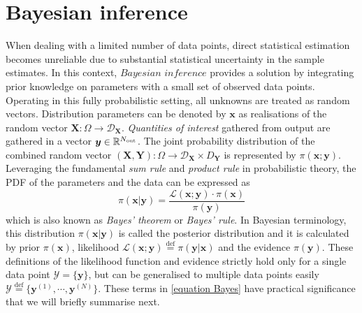 \label{ch:Bayesian}


\section{Bayesian inference}

When dealing with a limited number of data points, direct statistical estimation becomes unreliable due to substantial statistical uncertainty in the sample estimates. In this context, $\textit{Bayesian inference}$ provides a solution by integrating prior knowledge on parameters with a small set of observed data points. Operating in this fully probabilistic setting, all unknowns are treated as random vectors. Distribution parameters can be denoted by $\boldsymbol{x}$ as realisations of the random vector $\boldsymbol{X}:\Omega \rightarrow \mathcal{D}_{\boldsymbol{X}}$. \textit{Quantities of interest} gathered from output are gathered in a vector $\boldsymbol{y} \in \mathbb{R}^{N_{\rm{out}}}$. The joint probability distribution of the combined random vector $(\boldsymbol{X},\boldsymbol{Y}):\Omega \rightarrow \mathcal{D}_{\boldsymbol{X}} \times {D}_{\boldsymbol{Y}}$ is represented by $\pi(\boldsymbol{x};\boldsymbol{y})$. Leveraging the fundamental \textit{sum rule} and \textit{product rule} in probabilistic theory, the \acrfull{PDF} of the parameters and the data can be expressed as
\begin{equation}
\pi(\boldsymbol{x}|\boldsymbol{y}) = \frac{{\mathcal{L}(\boldsymbol{x};\boldsymbol{y}) \cdot \pi(\boldsymbol{x})}}{{\pi(\boldsymbol{y})}} \label{equation Bayes}
\end{equation}
which is also known as \textit{Bayes' theorem} or \textit{Bayes' rule}. In Bayesian terminology, this distribution $\pi(\boldsymbol{x}|\boldsymbol{y})$ is called the posterior distribution and it is calculated by prior $\pi(\boldsymbol{x})$, likelihood $\mathcal{L}(\boldsymbol{x};\boldsymbol{y})\stackrel{\mathrm{def}}{=}\pi(\boldsymbol{y}|\boldsymbol{x})$
and the evidence $\pi(\boldsymbol{y})$. These definitions of the likelihood function and evidence strictly hold only for a single data point $\mathcal{Y}=\{\boldsymbol{y} \}$, but can be generalised to multiple data points easily $\mathcal{Y} \stackrel{\mathrm{def}}{=} \{{\boldsymbol{y}^{(1)}},\cdots,{\boldsymbol{y}^{(N)}}\}$. These terms in \cref{equation Bayes} have practical significance that we will briefly summarise next.
